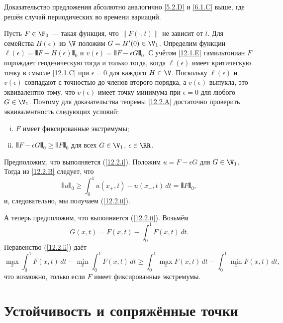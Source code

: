 Доказательство предложения абсолютно аналогично \ref{5.2.D} и \ref{6.1.C} выше, где решён случай периодических во времени вариаций.

Пусть $F\in\F_0$ --- такая функция, что $\|F(\cdot, t)\|$ не зависит от $t$.
Для семейства $H(\epsilon)$ из $\V$ положим $G = H'(0)\in\V_1$.
Определим функции $\ell(\epsilon) = \VERT F - H(\epsilon)\VERT_0$ и $v(\epsilon) = \VERT F - \epsilon G\VERT_0$.
С учётом \ref{12.1.E} гамильтониан $F$ порождает геодезическую тогда и только тогда, когда $\ell(\epsilon)$ имеет критическую точку в смысле \ref{12.1.C} при $\epsilon= 0$ для каждого $H\in\V$.
Поскольку $\ell(\epsilon)$ и $v(\epsilon)$ совпадают с точностью до членов второго порядка, а $v(\epsilon)$ выпукла, это эквивалентно тому, что $v(\epsilon)$ имеет точку минимума при $\epsilon= 0$ для любого $G\in\V_1$.
Поэтому для доказательства теоремы \ref{12.2.A} достаточно проверить эквивалентность следующих условий:
\begin{enumerate}[(i)]
\item\label{12.2.i} $F$ имеет фиксированные экстремумы;
\item\label{12.2.ii} $\VERT F - \epsilon G\VERT_0 \ge \VERT F\VERT_0$ для всех $G\in\V_1$, $\epsilon\in\RR$.
\end{enumerate} 

Предположим, что выполняется (\ref{12.2.i}).
Положим 
$u=F-\epsilon G$ для $G\in \V_1$.
Тогда из \ref{12.2.B} следует, что 
\[\VERT u\VERT_0 \ge \int_0^1 u(x_+,t)-u(x_-,t)\,dt=\VERT F\VERT_0,\]
и, следовательно, мы получаем (\ref{12.2.ii}).

А теперь предположим, что выполняется (\ref{12.2.ii}).
Возьмём 
\[G(x, t) = F(x, t) - \int_0^1F(x,t)\,dt.\]
Неравенство (\ref{12.2.ii}) даёт 
\[
\max_x\!\int_0^1 F(x, t)\,dt- \min_x\!\int_0^1 F(x, t)\,dt
\ge
\int_0^1 \max_xF(x, t)\,dt-\! \int_0^1\min_x F(x, t)\,dt,
\]
что возможно, только если $F$ имеет фиксированные экстремумы.
\qeds


\section{Устойчивость и сопряжённые точки}

